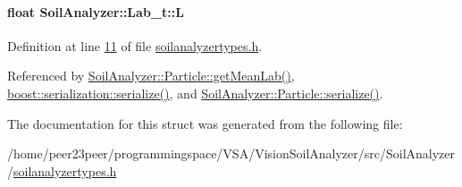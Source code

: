 \paragraph[{L}]{\setlength{\rightskip}{0pt plus 5cm}float Soil\+Analyzer\+::\+Lab\+\_\+t\+::\+L}\label{struct_soil_analyzer_1_1_lab__t_a95bd9662f683628a0ead6760bc194eaa}


Definition at line \hyperlink{soilanalyzertypes_8h_source_l00011}{11} of file \hyperlink{soilanalyzertypes_8h_source}{soilanalyzertypes.\+h}.



Referenced by \hyperlink{particle_8cpp_source_l00096}{Soil\+Analyzer\+::\+Particle\+::get\+Mean\+Lab()}, \hyperlink{lab__t__archive_8h_source_l00021}{boost\+::serialization\+::serialize()}, and \hyperlink{particle_8h_source_l00083}{Soil\+Analyzer\+::\+Particle\+::serialize()}.



The documentation for this struct was generated from the following file\+:\begin{DoxyCompactItemize}
\item 
/home/peer23peer/programmingspace/\+V\+S\+A/\+Vision\+Soil\+Analyzer/src/\+Soil\+Analyzer/\hyperlink{soilanalyzertypes_8h}{soilanalyzertypes.\+h}\end{DoxyCompactItemize}
